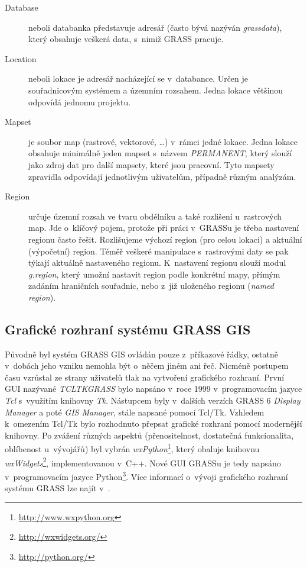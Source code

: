 \documentclass[a4paper,12pt,draft]{article}
\begin{document}
\begin{description}
\item[Database] neboli databanka představuje adresář (často bývá nazýván 
\emph{grassdata}), který obsahuje veškerá data, s~nimiž GRASS pracuje.
\item [Location] neboli lokace je adresář nacházející se
v~databance. Určen je souřadni\-covým systémem a územním rozsahem. Jedna
lokace většinou odpovídá jednomu projektu.
\item [Mapset] je soubor map (rastrové, vektorové, \ldots) v~rámci
jedné lokace. Jedna lokace obsahuje minimálně jeden mapset s~názvem
\emph{PERMANENT}, který  slouží jako zdroj dat pro další mapsety, které jsou
pracovní. Tyto mapsety zpravidla odpovídají jednotlivým uživatelům,
případně různým analýzám.
\item [Region] určuje územní rozsah ve tvaru obdélníku a také
rozlišení u~rastrových map. Jde o~klíčový
pojem, protože při práci v~GRASSu je třeba nastavení regionu často
řešit.  Rozlišujeme výchozí region (pro celou lokaci) a aktuální
(výpočetní) region. Téměř veškeré manipulace s~rastrovými daty se pak
týkají aktuálně nastaveného regionu. K~nastavení regionu slouží
modul \emph{g.region}, který umožní nastavit region podle konkrétní mapy,
přímým zadá\-ním hraničních souřadnic, nebo z~již uloženého regionu
(\emph{named region}).
 \end{description}



\subsection{Grafické rozhraní systému GRASS GIS}
Původně byl systém GRASS GIS ovládán pouze z~příkazové
řádky, ostatně v~dobách jeho vzniku nemohla být o~něčem jiném ani
řeč. Nicméně postupem času vzrůstal ze strany uživatelů tlak na
vytvoření grafického rozhraní. První GUI nazývané \emph{TCLTKGRASS}
bylo napsáno v~roce 1999 v~programovacím jazyce \emph{Tcl} s~využitím
knihovny \emph{Tk}.
Nástupcem byly v~dalších verzích GRASS 6 \emph{Display
Manager} a poté \emph{GIS Manager}, stále napsané pomocí Tcl/Tk. Vzhledem
k~omezením Tcl/Tk bylo rozhodnuto přepsat grafické rozhraní pomocí
modernější knihovny. Po zvážení různých aspektů (přenositel\-nost,
dostatečná funkcionalita, oblíbenost u~vývojářů) 
byl vybrán \emph{wxPython}\footnote{\url{http://www.wxpython.org}}, který
obaluje knihovnu \emph{wxWidgets}\footnote{\url{http://wxwidgets.org/}},
implementovanou v~C++. Nové GUI GRASSu je
tedy napsáno v~programovacím jazyce
Python\footnote{\url{http://python.org/}}.
Více informací o~vývoji grafického rozhraní systému GRASS lze najít
v~\cite{wxGUI_clanek}.
\end{document}
